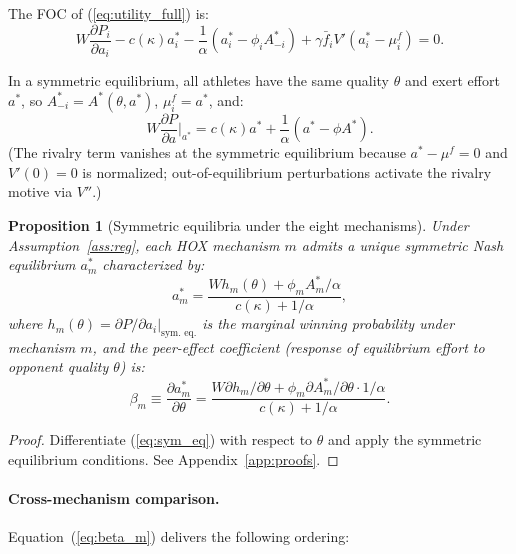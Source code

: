 \documentclass[12pt]{article}
\newtheorem{proposition}{Proposition}
\theoremstyle{definition}
\theoremstyle{remark}
\begin{document}
The FOC of (\ref{eq:utility_full}) is:
\begin{equation}
W\frac{\partial P_i}{\partial a_i} - c(\kappa) a_i^*
  - \frac{1}{\alpha}(a_i^* - \phi_i A_{-i}^*)
  + \gamma \bar{f}_i V'(a_i^* - \mu_i^f) = 0.
\label{eq:FOC_general}
\end{equation}

In a symmetric equilibrium, all athletes have the same quality $\theta$ and exert
effort $a^*$, so $A_{-i}^* = A^*(\theta, a^*)$, $\mu_i^f = a^*$, and:
\begin{equation}
W\frac{\partial P}{\partial a}\Big|_{a^*}
= c(\kappa) a^* + \frac{1}{\alpha}(a^* - \phi A^*).
\label{eq:sym_eq}
\end{equation}
(The rivalry term vanishes at the symmetric equilibrium because $a^* - \mu^f = 0$
and $V'(0) = 0$ is normalized; out-of-equilibrium perturbations activate the
rivalry motive via $V''$.)

\begin{proposition}[Symmetric equilibria under the eight mechanisms]
\label{prop:eight}
Under Assumption~\ref{ass:reg}, each HOX mechanism $m$ admits a unique symmetric
Nash equilibrium $a_m^*$ characterized by:
\begin{equation}
a_m^* = \frac{W h_m(\theta) + \phi_m A_m^* / \alpha}{c(\kappa) + 1/\alpha},
\label{eq:a_star}
\end{equation}
where $h_m(\theta) = \partial P / \partial a_i |_{\text{sym. eq.}}$ is the
marginal winning probability under mechanism $m$, and the peer-effect coefficient
(response of equilibrium effort to opponent quality $\theta$) is:
\begin{equation}
\beta_m \equiv \frac{\partial a_m^*}{\partial \theta}
= \frac{W \partial h_m/\partial\theta + \phi_m \partial A_m^*/\partial\theta \cdot 1/\alpha}
       {c(\kappa) + 1/\alpha}.
\label{eq:beta_m}
\end{equation}
\end{proposition}

\begin{proof}
Differentiate (\ref{eq:sym_eq}) with respect to $\theta$ and apply the symmetric
equilibrium conditions.
See Appendix~\ref{app:proofs}.
\end{proof}

\paragraph{Cross-mechanism comparison.}
Equation~(\ref{eq:beta_m}) delivers the following ordering:
\end{document}
